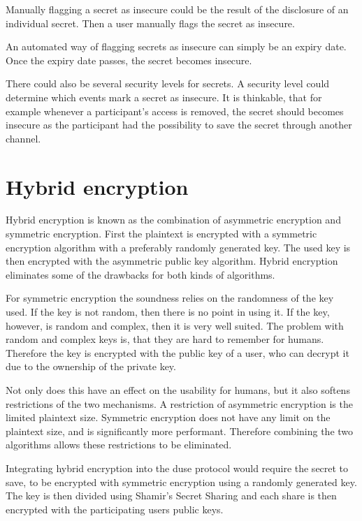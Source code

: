 Manually flagging a secret as insecure could be the result of the disclosure of
an individual secret. Then a user manually flags the secret as insecure.

An automated way of flagging secrets as insecure can simply be an expiry date.
Once the expiry date passes, the secret becomes insecure.

There could also be several security levels for secrets. A security level could
determine which events mark a secret as insecure. It is thinkable, that for
example whenever a participant's access is removed, the secret should becomes
insecure as the participant had the possibility to save the secret through
another channel.

\section{Hybrid encryption}

Hybrid encryption is known as the combination of asymmetric encryption and
symmetric encryption. First the plaintext is encrypted with a symmetric
encryption algorithm with a preferably randomly generated key. The used key is
then encrypted with the asymmetric public key algorithm. Hybrid encryption
eliminates some of the drawbacks for both kinds of algorithms. \cite{hybrid_encryption}

For symmetric encryption the soundness relies on the randomness of the key
used. If the key is not random, then there is no point in using it. If the key,
however, is random and complex, then it is very well suited. The problem with
random and complex keys is, that they are hard to remember for humans.
Therefore the key is encrypted with the public key of a user, who can decrypt
it due to the ownership of the private key.

Not only does this have an effect on the usability for humans, but it also
softens restrictions of the two mechanisms. A restriction of asymmetric
encryption is the limited plaintext size. Symmetric encryption does not have
any limit on the plaintext size, and is significantly more performant.
Therefore combining the two algorithms allows these restrictions to be
eliminated. \cite{pgp_evaluation}

Integrating hybrid encryption into the duse protocol would require the secret
to save, to be encrypted with symmetric encryption using a randomly generated
key. The key is then divided using Shamir's Secret Sharing and each share is
then encrypted with the participating users public keys.

